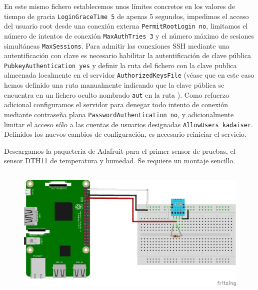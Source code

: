 En este mismo fichero establecemos unos límites concretos en los valores de tiempo de gracia \verb|LoginGraceTime 5| de apenas 5 segundos, impedimos el acceso del usuario root desde una conexión externa \verb|PermitRootLogin no|, limitamos el número de intentos de conexión \verb|MaxAuthTries 3| y el número máximo de sesiones simultáneas \verb|MaxSessions|. Para admitir las conexiones SSH mediante una autentificación con clave es necesario habilitar la autentificación de clave pública \verb|PubkeyAuthentication yes| y definir la ruta del fichero con la clave publica almcenada localmente en el servidor \verb|AuthorizedKeysFile|  (véase que en este caso hemos definido una ruta manualmente indicando que la clave pública se encuentra en un fichero oculto nombrado \verb|aut| en la ruta ). Como refuerzo adicional configuramos el servidor para denegar todo intento de conexión mediante contraseña plana \verb|PasswordAuthentication no|, y adicionalmente limitar el acceso sólo a las cuentas de usuarios designadas \verb|AllowUsers kadaiser|. Definidos los nuevos cambios de configuración, es necesario reiniciar el servicio.

Descargamos la paquetería de Adafruit para el primer sensor de pruebas, el sensor DTH11 de temperatura y humedad.
Se requiere un montaje sencillo.
\begin{figure}[hbt!]
\centering
\includegraphics[height=2.5in]{figures/nodo_1.png}
\end{figure}

